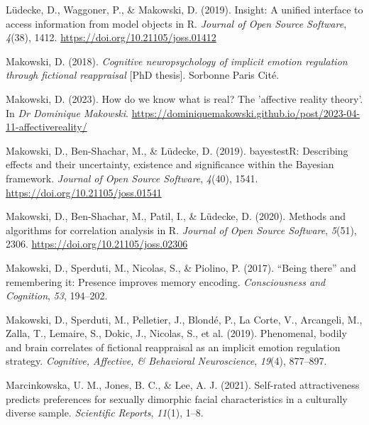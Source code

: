 \documentclass[
  man,floatsintext]{apa6}
\newlength{\cslhangindent}
\newlength{\cslentryspacingunit} %
\newenvironment{CSLReferences}[2] %
 {%
  \setlength{\parindent}{0pt}
  \ifodd #1
  \let\oldpar\par
  \def\par{\hangindent=\cslhangindent\oldpar}
  \fi
  \setlength{\parskip}{#2\cslentryspacingunit}
 }%
 {}
\begin{document}
\begin{CSLReferences}{1}{0}
\leavevmode{}%
Lüdecke, D., Waggoner, P., \& Makowski, D. (2019). Insight: A unified interface to access information from model objects in {R}. \emph{Journal of Open Source Software}, \emph{4}(38), 1412. \url{https://doi.org/10.21105/joss.01412}

\leavevmode{}%
Makowski, D. (2018). \emph{Cognitive neuropsychology of implicit emotion regulation through fictional reappraisal} {[}PhD thesis{]}. Sorbonne Paris Cit{é}.

\leavevmode{}%
Makowski, D. (2023). How do we know what is real? The 'affective reality theory'. In \emph{Dr Dominique Makowski}. \url{https://dominiquemakowski.github.io/post/2023-04-11-affectivereality/}

\leavevmode{}%
Makowski, D., Ben-Shachar, M., \& Lüdecke, D. (2019). {bayestestR}: Describing effects and their uncertainty, existence and significance within the {Bayesian} framework. \emph{Journal of Open Source Software}, \emph{4}(40), 1541. \url{https://doi.org/10.21105/joss.01541}

\leavevmode{}%
Makowski, D., Ben-Shachar, M., Patil, I., \& Lüdecke, D. (2020). Methods and algorithms for correlation analysis in {R}. \emph{Journal of Open Source Software}, \emph{5}(51), 2306. \url{https://doi.org/10.21105/joss.02306}

\leavevmode{}%
Makowski, D., Sperduti, M., Nicolas, S., \& Piolino, P. (2017). {``Being there''} and remembering it: Presence improves memory encoding. \emph{Consciousness and Cognition}, \emph{53}, 194--202.

\leavevmode{}%
Makowski, D., Sperduti, M., Pelletier, J., Blondé, P., La Corte, V., Arcangeli, M., Zalla, T., Lemaire, S., Dokic, J., Nicolas, S., et al. (2019). Phenomenal, bodily and brain correlates of fictional reappraisal as an implicit emotion regulation strategy. \emph{Cognitive, Affective, \& Behavioral Neuroscience}, \emph{19}(4), 877--897.

\leavevmode{}%
Marcinkowska, U. M., Jones, B. C., \& Lee, A. J. (2021). Self-rated attractiveness predicts preferences for sexually dimorphic facial characteristics in a culturally diverse sample. \emph{Scientific Reports}, \emph{11}(1), 1--8.


\end{CSLReferences}
\end{document}
